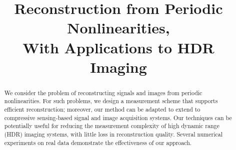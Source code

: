 \documentclass{article}
\title{Reconstruction from Periodic Nonlinearities, \\ With Applications to HDR Imaging}
\numberwithin{equation}{section}
\begin{document}
\ninept
%
\maketitle
%
\begin{abstract}
We consider the problem of reconstructing signals and images from periodic nonlinearities. For such problems, we design a measurement scheme that supports efficient reconstruction; moreover, our method can be adapted to extend to compressive sensing-based signal and image acquisition systems. Our techniques can be potentially useful for reducing the measurement complexity of high dynamic range (HDR) imaging systems, with little loss in reconstruction quality. Several numerical experiments on real data demonstrate the effectiveness of our approach.
\end{abstract}
%












{{
\footnotesize


}
}
\end{document}
